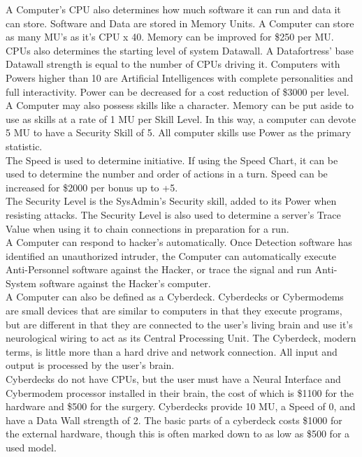 \documentclass[11pt,twoside,a4paper]{article}
\begin{document}
\begin{multicols*}{2}
A Computer's CPU also determines how much software it can run and data it can store. Software and Data are stored in Memory Units. A Computer can store as many MU's as it's CPU x 40. Memory can be improved for \$250 per MU. CPUs also determines the starting level of system Datawall. A Datafortress' base Datawall strength is equal to the number of CPUs driving it. Computers with Powers higher than 10 are Artificial Intelligences with complete personalities and full interactivity. Power can be decreased for a cost reduction of \$3000 per level. A Computer may also possess skills like a character. Memory can be put aside to use as skills at a rate of 1 MU per Skill Level. In this way, a computer can devote 5 MU to have a Security Skill of 5. All computer skills use Power as the primary statistic. ~\\

The Speed is used to determine initiative. If using the Speed Chart, it can be used to determine the number and order of actions in a turn. Speed can be increased for \$2000 per bonus up to +5. ~\\

The Security Level is the SysAdmin's Security skill, added to its Power when resisting attacks. The Security Level is also used to determine a server's Trace Value when using it to chain connections in preparation for a run. ~\\

A Computer can respond to hacker's automatically. Once Detection software has identified an unauthorized intruder, the Computer can automatically execute Anti-Personnel software against the Hacker, or trace the signal and run Anti-System software against the Hacker's computer. ~\\

A Computer can also be defined as a Cyberdeck. Cyberdecks or Cybermodems are small devices that are similar to computers in that they execute programs, but are different in that they are connected to the user's living brain and use it's neurological wiring to act as its Central Processing Unit. The Cyberdeck, modern terms, is little more than a hard drive and network connection. All input and output is processed by the user's brain. ~\\

Cyberdecks do not have CPUs, but the user must have a Neural Interface and Cybermodem processor installed in their brain, the cost of which is \$1100 for the hardware and \$500 for the surgery. Cyberdecks provide 10 MU, a Speed of 0, and have a Data Wall strength of 2. The basic parts of a cyberdeck costs \$1000 for the external hardware, though this is often marked down to as low as \$500 for a used model. ~\\


\end{multicols*}
\end{document}

